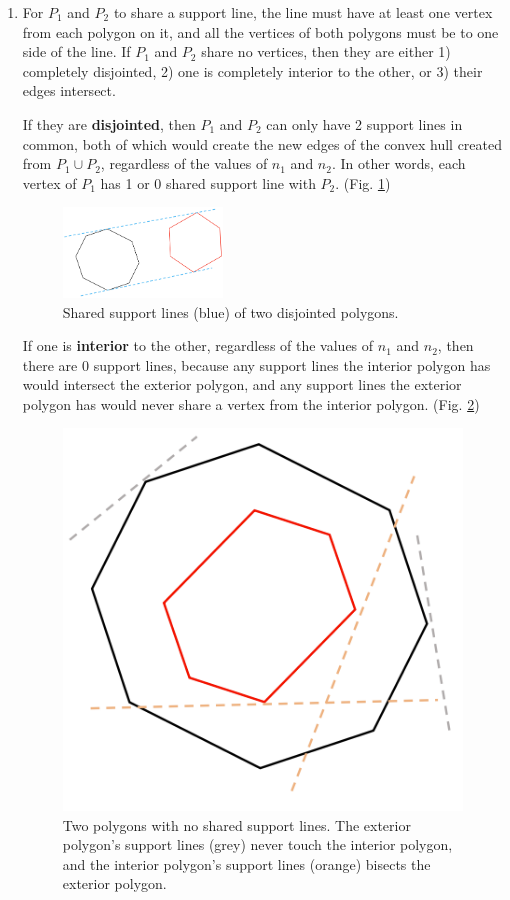 \documentclass [12pt]{article}
\begin{document}
    \begin{enumerate}[label=(\alph*)]
        \item For $P_1$ and $P_2$ to share a support line, the line must have at least one vertex from each polygon on it, and all the vertices of both polygons must be to one side of the line. If $P_1$ and $P_2$ share no vertices, then they are either 1) completely disjointed, 2) one is completely interior to the other, or 3) their edges intersect. 
        
        If they are \textbf{disjointed}, then $P_1$ and $P_2$ can only have 2 support lines in common, both of which would create the new edges of the convex hull created from $P_1 \cup P_2$, regardless of the values of $n_1$ and $n_2$. In other words, each vertex of $P_1$ has 1 or 0 shared support line with $P_2$. (Fig. \ref{fig:supportline1a})
            \begin{figure}[h]
                \centering 
                \includegraphics[width=0.4\textwidth]{images/supportline1a.PNG}
                \caption{Shared support lines (blue) of two disjointed polygons.}
                \label{fig:supportline1a}
            \end{figure}
        
        If one is \textbf{interior} to the other, regardless of the values of $n_1$ and $n_2$, then there are 0 support lines, because any support lines the interior polygon has would intersect the exterior polygon, and any support lines the exterior polygon has would never share a vertex from the interior polygon. (Fig. \ref{fig:supportline2a})
            \begin{figure}[h]
                \centering 
                \includegraphics[width=0.2\linewidth]{images/supportline2a.PNG}
                \caption{Two polygons with no shared support lines. The exterior polygon's support lines (grey) never touch the interior polygon, and the interior polygon's support lines (orange) bisects the exterior polygon.}
                \label{fig:supportline2a}
            \end{figure}
        

\end{enumerate}
\end{document}
